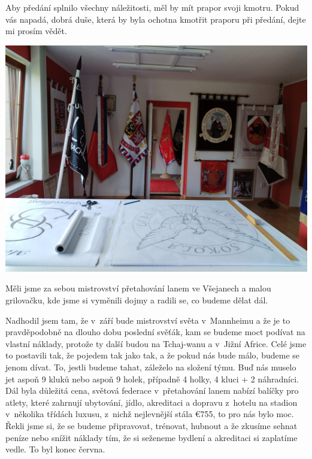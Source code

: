 \documentclass[11pt]{article}
\begin{document}
Aby předání splnilo všechny náležitosti, měl by mít prapor svoji kmotru. Pokud vás napadá, dobrá duše, která by byla ochotna kmotřit praporu při předání, dejte mi prosím vědět.

\signature{náčelník}{}

\vspace*{24pt}

\begin{center}
  \includegraphics[width=\linewidth]{./prapor-2.jpg}
\end{center}

\clearpage

Měli jsme za sebou mistrovství přetahování lanem ve Všejanech a malou grilovačku, kde jsme si vyměnili dojmy a radili se, co budeme dělat dál.

Nadhodil jsem tam, že v~září bude mistrovství světa v~Mannheimu a že je to pravděpodobně na dlouho dobu poslední svěťák, kam se budeme moct podívat na vlastní náklady, protože ty další budou na Tchaj-wanu a v~Jižní Africe. Celé jsme to postavili tak, že pojedem tak jako tak, a že pokud nás bude málo, budeme se jenom dívat. To, jestli budeme tahat, záleželo na složení týmu. Buď nás muselo jet aspoň 9 kluků nebo aspoň 9 holek, případně 4 holky, 4 kluci + 2 náhradníci. Dál byla důležitá cena, světová federace v~přetahování lanem nabízí balíčky pro atlety, které zahrnují ubytování, jídlo, akreditaci a dopravu z~hotelu na stadion v~několika třídách luxusu, z~nichž nejlevnější stála €755, to pro nás bylo moc. Řekli jsme si, že se budeme připravovat, trénovat, hubnout a že zkusíme sehnat peníze nebo snížit náklady tím, že si seženeme bydlení a akreditaci si zaplatíme vedle. To byl konec června.
\end{document}
